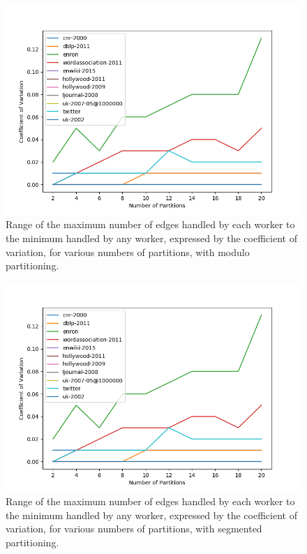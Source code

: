 \begin{figure}
	\centering
	\includegraphics[width=\columnwidth]{../good_plots/range_as_cv_modulo.png}
	\caption{Range of the maximum number of edges handled by each worker to the 
	minimum handled by any worker, expressed by the coefficient of variation, 
	for various numbers of partitions, with modulo partitioning.}
	\label{fig:cv_mod}
\end{figure}

\begin{figure}
	\centering
	\includegraphics[width=\columnwidth]{../good_plots/range_as_cv_modulo.png}
	\caption{Range of the maximum number of edges handled by each worker to the 
		minimum handled by any worker, expressed by the coefficient of 
		variation, for various numbers of partitions, with segmented 
		partitioning.}
	\label{fig:cv_range}
\end{figure}

